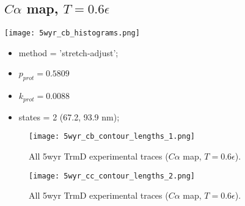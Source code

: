 \subsection{$C\alpha$ map, $T=0.6\epsilon$}
\label{subsec:5wyr-cb}
\begin{minipage}[c]{0.7\textwidth}
    \texttt{[image: 5wyr\_cb\_histograms.png]}
\end{minipage}
\hfill
\begin{minipage}[c]{0.45\textwidth}
    \begin{itemize}
        \item method = 'stretch-adjust';
        \item $p_{prot}=0.5809$
        \item $k_{prot}=0.0088$
        \item states = 2 (67.2, 93.9 nm);
    \end{itemize}
\end{minipage}

\begin{figure}
    \centering
    \texttt{[image: 5wyr\_cb\_contour\_lengths\_1.png]}
    \caption{All 5wyr TrmD experimental traces ($C\alpha$ map, $T=0.6\epsilon$).}
    \label{fig:5wyr-cb-cl1}
\end{figure}

\begin{figure}
    \centering
    \texttt{[image: 5wyr\_cc\_contour\_lengths\_2.png]}
    \caption{All 5wyr TrmD experimental traces ($C\alpha$ map, $T=0.6\epsilon$).}
    \label{fig:5wyr-cb-cl2}
\end{figure}

